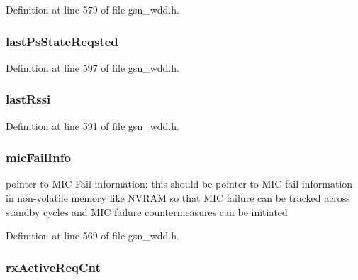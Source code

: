 Definition at line 579 of file gsn\_\-wdd.h.

\hypertarget{a00282_a0a4ec0bdbd4cdf3511df5e31f1b8eeed}{
\subsubsection[{lastPsStateReqsted}]{ {\bf lastPsStateReqsted}}}
\label{a00282_a0a4ec0bdbd4cdf3511df5e31f1b8eeed}


Definition at line 597 of file gsn\_\-wdd.h.

\hypertarget{a00282_ab51ac124f098a070cec5bf8c41f50af9}{
\subsubsection[{lastRssi}]{ {\bf lastRssi}}}
\label{a00282_ab51ac124f098a070cec5bf8c41f50af9}


Definition at line 591 of file gsn\_\-wdd.h.

\hypertarget{a00282_ac30e33b6d4676a7edce742595bc2132a}{
\subsubsection[{micFailInfo}]{ {\bf micFailInfo}}}
\label{a00282_ac30e33b6d4676a7edce742595bc2132a}
pointer to MIC Fail information; this should be pointer to MIC fail information in non-\/volatile memory like NVRAM so that MIC failure can be tracked across standby cycles and MIC failure countermeasures can be initiated 

Definition at line 569 of file gsn\_\-wdd.h.

\hypertarget{a00282_a125a8eaa4e3d225ee2ef6a97c49b1623}{
\subsubsection[{rxActiveReqCnt}]{ {\bf rxActiveReqCnt}}}
\label{a00282_a125a8eaa4e3d225ee2ef6a97c49b1623}


